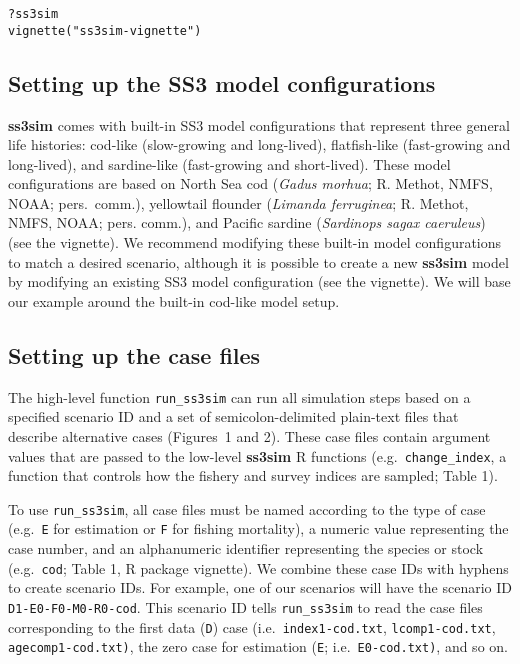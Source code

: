 \documentclass[10pt]{article}
\begin{document}
\begin{verbatim}
?ss3sim
vignette("ss3sim-vignette")
\end{verbatim}

\subsection*{Setting up the SS3 model configurations}

\textbf{ss3sim} comes with built-in SS3 model configurations that represent
three general life histories: cod-like (slow-growing and long-lived),
flatfish-like (fast-growing and long-lived), and sardine-like (fast-growing and
short-lived). These model configurations are based on North Sea cod
(\emph{Gadus morhua}; R. Methot, NMFS, NOAA; pers.~comm.), yellowtail flounder
(\emph{Limanda ferruginea}; R. Methot, NMFS, NOAA; pers. comm.), and Pacific
sardine (\emph{Sardinops sagax caeruleus}) \cite{hill2012} (see the vignette). We
recommend modifying these built-in model configurations to match a desired
scenario, although it is possible to create a new \textbf{ss3sim} model by
modifying an existing SS3 model configuration (see the vignette). We will base our
example around the built-in cod-like model setup.

\subsection*{Setting up the case files}

The high-level function \texttt{run\_ss3sim} can run all simulation steps based
on a specified scenario ID and a set of semicolon-delimited plain-text files
that describe alternative cases (Figures~1 and 2). These case files
contain argument values that are passed to the low-level \textbf{ss3sim}
\textsf{R} functions (e.g.~\texttt{change\_index}, a function that controls how
the fishery and survey indices are sampled; Table 1).

To use \texttt{run\_ss3sim}, all case files must be named according to the type
of case (e.g.~\texttt{E} for estimation or \texttt{F} for fishing mortality), a
numeric value representing the case number, and an alphanumeric identifier
representing the species or stock (e.g.~\texttt{cod}; Table 1, \textsf{R} package vignette). We
combine these case IDs with hyphens to create scenario IDs. For example, one of
our scenarios will have the scenario ID \texttt{D1-E0-F0-M0-R0-cod}. This
scenario ID tells \texttt{run\_ss3sim} to read the case files corresponding to
the first data (\texttt{D}) case (i.e.~\texttt{index1-cod.txt},
\texttt{lcomp1-cod.txt}, \texttt{agecomp1-cod.txt)}, the zero case for
estimation (\texttt{E}; i.e.~\texttt{E0-cod.txt)}, and so on.
\end{document}
